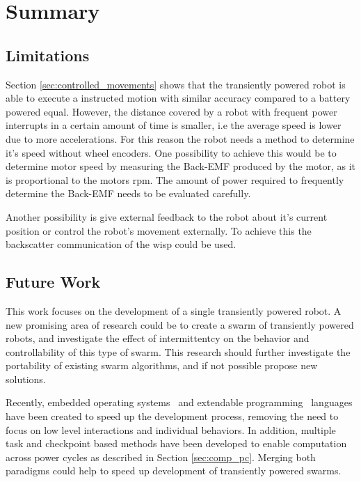 \chapter{Summary}
\label{chp:summary}

\section{Limitations}

Section \ref{sec:controlled_movements} shows that the transiently powered robot is able to execute a instructed motion with similar accuracy compared to a battery powered equal.
However, the distance covered by a robot with frequent power interrupts in a certain amount of time is smaller, i.e the average speed is lower due to more accelerations.
For this reason the robot needs a method to determine it's speed without wheel encoders.
One possibility to achieve this would be to determine motor speed by measuring the Back-EMF produced by the motor, as it is proportional to the motors rpm. %
The amount of power required to frequently determine the Back-EMF needs to be evaluated carefully.

Another possibility is give external feedback to the robot about it's current position or control the robot's movement externally.
To achieve this the backscatter communication of the wisp could be used.

\section{Future Work}

This work focuses on the development of a single transiently powered robot.
A new promising area of research could be to create a swarm of transiently powered robots, and investigate the effect of intermittentcy on the behavior and controllability of this type of swarm.
This research should further investigate the portability of existing swarm algorithms, and if not possible propose new solutions.	

Recently, embedded operating systems~\cite{trenkwalder_iros_2016} and extendable programming~\cite{pinciroli_iros_2016} languages have been created to speed up the development process, removing the need to focus on low level interactions and individual behaviors.
In addition, multiple task and checkpoint based methods have been developed to enable computation across power cycles as described in Section \ref{sec:comp_pc}.
Merging both paradigms could help to speed up development of transiently powered swarms.

